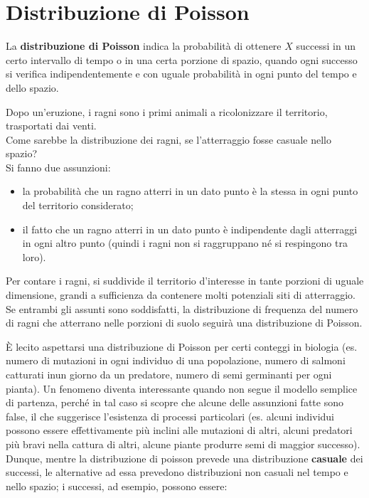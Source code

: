 \documentclass[10pt, draft]{book}
\newcounter{example}[section]
\begin{document}
\section{Distribuzione di Poisson}

La \textbf{distribuzione di Poisson} indica la probabilità di ottenere $X$ successi in un certo intervallo di tempo o in una certa porzione di spazio, quando ogni successo si verifica indipendentemente e con uguale probabilità in ogni punto del tempo e dello spazio.

\begin{example}
Dopo un'eruzione, i ragni sono i primi animali a ricolonizzare il territorio, trasportati dai venti.
\\
Come sarebbe la distribuzione dei ragni, se l'atterraggio fosse casuale nello spazio?
\\
Si fanno due assunzioni:
\begin{itemize}
    \item la probabilità che un ragno atterri in un dato punto è la stessa in ogni punto del territorio considerato;
    \item il fatto che un ragno atterri in un dato punto è indipendente dagli atterraggi in ogni altro punto (quindi i ragni non si raggruppano né si respingono tra loro).
\end{itemize}
Per contare i ragni, si suddivide il territorio d'interesse in tante porzioni di uguale dimensione, grandi a sufficienza da contenere molti potenziali siti di atterraggio.
\\
Se entrambi gli assunti sono soddisfatti, la distribuzione di frequenza del numero di ragni che atterrano nelle porzioni di suolo seguirà una distribuzione di Poisson.
\end{example}
È lecito aspettarsi una distribuzione di Poisson per certi conteggi in biologia (es. numero di mutazioni in ogni individuo di una popolazione, numero di salmoni catturati inun giorno da un predatore, numero di semi germinanti per ogni pianta). Un fenomeno diventa interessante quando non segue il modello semplice di partenza, perché in tal caso si scopre che alcune delle assunzioni fatte sono false, il che suggerisce l'esistenza di processi particolari (es. alcuni individui possono essere effettivamente più inclini alle mutazioni di altri, alcuni predatori più bravi nella cattura di altri, alcune piante produrre semi di maggior successo).
\\
Dunque, mentre la distribuzione di poisson prevede una distribuzione \textbf{casuale} dei successi, le alternative ad essa prevedono distribuzioni non casuali nel tempo e nello spazio; i successi, ad esempio, possono essere:
\end{document}
